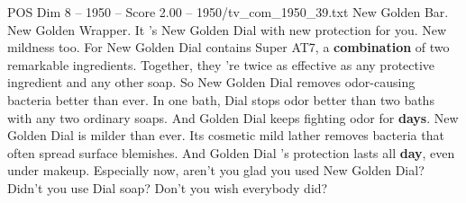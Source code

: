 \begin{textsample}{POS Dim 8 – 1950 – Score 2.00 – 1950/tv\_com\_1950\_39.txt}  \label{ex:f8_pos_020}
New Golden Bar.
New Golden Wrapper.
It 's New Golden Dial with new protection for you.
New mildness too.
For New Golden Dial contains Super AT7, a \textbf{combination} of two remarkable ingredients.
Together, they 're twice as effective as any protective ingredient and any other soap.
So New Golden Dial removes odor-causing bacteria better than ever.
In one bath, Dial stops odor better than two baths with any two ordinary soaps.
And Golden Dial keeps fighting odor for \textbf{days}.
New Golden Dial is milder than ever.
Its cosmetic mild lather removes bacteria that often spread surface blemishes.
And Golden Dial 's protection lasts all \textbf{day}, even under makeup.
Especially now, aren't you glad you used New Golden Dial?
Didn't you use Dial soap?
Don't you wish everybody did?

\end{textsample}
